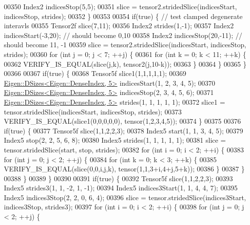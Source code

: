 \begin{DoxyCode}
00350     Index2 indicesStop(5,5);
00351     slice = tensor2.stridedSlice(indicesStart, indicesStop, strides);
00352   \}
00353 
00354   \textcolor{keywordflow}{if}(\textcolor{keyword}{true}) \{ \textcolor{comment}{// test clamped degenerate interavls}
00355     Tensor2f slice(7,11);
00356     Index2 strides(1,-1);
00357     Index2 indicesStart(-3,20); \textcolor{comment}{// should become 0,10}
00358     Index2 indicesStop(20,-11); \textcolor{comment}{// should become 11, -1}
00359     slice = tensor2.stridedSlice(indicesStart, indicesStop, strides);
00360     \textcolor{keywordflow}{for} (\textcolor{keywordtype}{int} j = 0; j < 7; ++j) \{
00361       \textcolor{keywordflow}{for} (\textcolor{keywordtype}{int} k = 0; k < 11; ++k) \{
00362         VERIFY\_IS\_EQUAL(slice(j,k), tensor2(j,10-k));
00363       \}
00364     \}
00365   \}
00366 
00367   \textcolor{keywordflow}{if}(\textcolor{keyword}{true}) \{
00368     Tensor5f slice1(1,1,1,1,1);
00369     \hyperlink{struct_eigen_1_1_d_sizes}{Eigen::DSizes<Eigen::DenseIndex, 5>} indicesStart(1, 2, 3, 4, 5);
00370     \hyperlink{struct_eigen_1_1_d_sizes}{Eigen::DSizes<Eigen::DenseIndex, 5>} indicesStop(2, 3, 4, 5, 6);
00371     \hyperlink{struct_eigen_1_1_d_sizes}{Eigen::DSizes<Eigen::DenseIndex, 5>} strides(1, 1, 1, 1, 1);
00372     slice1 = tensor.stridedSlice(indicesStart, indicesStop, strides);
00373     VERIFY\_IS\_EQUAL(slice1(0,0,0,0,0), tensor(1,2,3,4,5));
00374   \}
00375 
00376   \textcolor{keywordflow}{if}(\textcolor{keyword}{true}) \{
00377     Tensor5f slice(1,1,2,2,3);
00378     Index5 start(1, 1, 3, 4, 5);
00379     Index5 stop(2, 2, 5, 6, 8);
00380     Index5 strides(1, 1, 1, 1, 1);
00381     slice = tensor.stridedSlice(start, stop, strides);
00382     \textcolor{keywordflow}{for} (\textcolor{keywordtype}{int} i = 0; i < 2; ++i) \{
00383       \textcolor{keywordflow}{for} (\textcolor{keywordtype}{int} j = 0; j < 2; ++j) \{
00384         \textcolor{keywordflow}{for} (\textcolor{keywordtype}{int} k = 0; k < 3; ++k) \{
00385           VERIFY\_IS\_EQUAL(slice(0,0,i,j,k), tensor(1,1,3+i,4+j,5+k));
00386         \}
00387       \}
00388     \}
00389   \}
00390 
00391   \textcolor{keywordflow}{if}(\textcolor{keyword}{true}) \{
00392     Tensor5f slice(1,1,2,2,3);
00393     Index5 strides3(1, 1, -2, 1, -1);
00394     Index5 indices3Start(1, 1, 4, 4, 7);
00395     Index5 indices3Stop(2, 2, 0, 6, 4);
00396     slice = tensor.stridedSlice(indices3Start, indices3Stop, strides3);
00397     \textcolor{keywordflow}{for} (\textcolor{keywordtype}{int} i = 0; i < 2; ++i) \{
00398       \textcolor{keywordflow}{for} (\textcolor{keywordtype}{int} j = 0; j < 2; ++j) \{

\end{DoxyCode}
